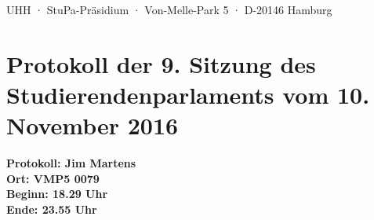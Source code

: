 \documentclass[ngerman,headheight=70pt]{scrartcl}
\begin{document}
    UHH · StuPa-Präsidium · Von-Melle-Park 5 · D-20146 Hamburg

    \section*{Protokoll der 9. Sitzung des Studierendenparlaments vom 10. November 2016}

    \textbf{Protokoll: Jim Martens}\\
    \textbf{Ort: VMP5 0079}\\
    \textbf{Beginn: 18.29 Uhr}\\
    \textbf{Ende: 23.55 Uhr}

    \vspace{0.5cm}
\end{document}
